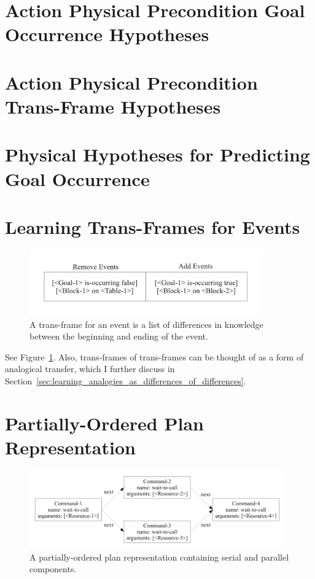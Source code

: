 \section{Action Physical Precondition Goal Occurrence Hypotheses}


\section{Action Physical Precondition Trans-Frame Hypotheses}


\section{Physical Hypotheses for Predicting Goal Occurrence}




\section{Learning Trans-Frames for Events}
\label{sec:learning_trans_frames_for_events}

\begin{figure}[bth]
  \center
  \includegraphics[width=10cm]{gfx/transframe}
  \caption[A trans-frame for an event]{A trans-frame for an event is a
    list of differences in knowledge between the beginning and ending
    of the event.}
  \label{fig:transframe}
\end{figure}

See Figure~\ref{fig:transframe}.  Also, trans-frames of trans-frames
can be thought of as a form of analogical transfer, which I further
discuss in
Section~\ref{sec:learning_analogies_as_differences_of_differences}.


\section{Partially-Ordered Plan Representation}

\begin{figure}[bth]
  \center
  \includegraphics[width=11cm]{gfx/serial_and_parallel_plan}
  \caption[A partially-ordered plan with serial and parallel
    components]{A partially-ordered plan representation containing
    serial and parallel components.}
  \label{fig:serial_and_parallel_plan}
\end{figure}

